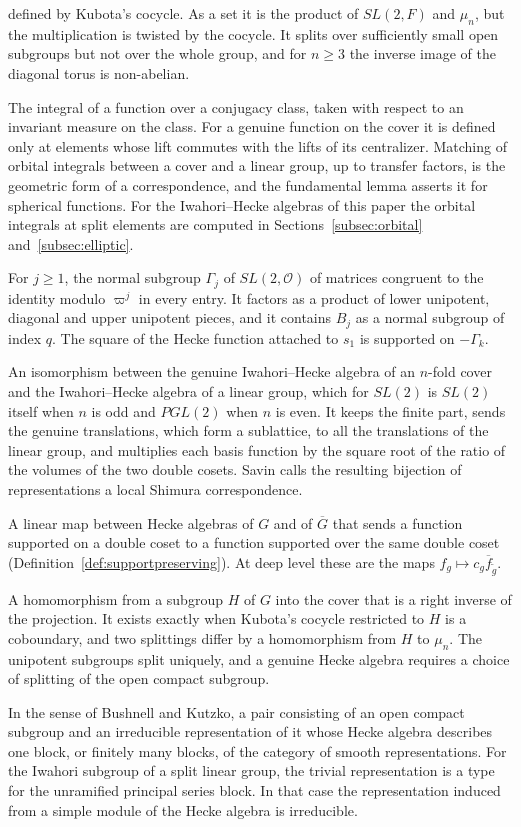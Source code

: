 \documentclass[12pt,letterpaper]{amsart}
\numberwithin{equation}{section}
\theoremstyle{definition}
\theoremstyle{remark}
\newcommand{\cO}{\mathcal{O}}
\newcommand{\Gbar}{\overline{G}}
\newcommand{\fbar}{\overline{f}}
\begin{document}
\begin{description}[leftmargin=1.5em,style=nextline]
defined by Kubota's cocycle. As a set it is the product of $SL(2,F)$ and
$\mu_n$, but the multiplication is twisted by the cocycle. It splits over
sufficiently small open subgroups but not over the whole group, and for
$n\geq 3$ the inverse image of the diagonal torus is non-abelian.
\item[Orbital integral] The integral of a function over a conjugacy
class, taken with respect to an invariant measure on the class. For a
genuine function on the cover it is defined only at elements whose
lift commutes with the lifts of its centralizer. Matching of orbital
integrals between a cover and a linear group, up to transfer factors,
is the geometric form of a correspondence, and the fundamental lemma
asserts it for spherical functions. For the Iwahori--Hecke algebras of
this paper the orbital integrals at split elements are computed in
Sections~\ref{subsec:orbital} and~\ref{subsec:elliptic}.
\item[Principal congruence subgroup] For $j\geq 1$, the normal subgroup
$\Gamma_j$ of $SL(2,\cO)$ of matrices congruent to the identity modulo
$\varpi^j$ in every entry. It factors as a product of lower unipotent,
diagonal and upper unipotent pieces, and it contains $B_j$ as a normal
subgroup of index $q$. The square of the Hecke function attached to
$s_1$ is supported on $-\Gamma_k$.
\item[Savin's isomorphism] An isomorphism between the genuine
Iwahori--Hecke algebra of an $n$-fold cover and the Iwahori--Hecke
algebra of a linear group, which for $SL(2)$ is $SL(2)$ itself when $n$
is odd and $PGL(2)$ when $n$ is even. It keeps the finite part, sends
the genuine translations, which form a sublattice, to all the
translations of the linear group, and multiplies each basis function by
the square root of the ratio of the volumes of the two double cosets.
Savin calls the resulting bijection of representations a local Shimura
correspondence.
\item[Support-preserving map] A linear map between Hecke algebras of
$G$ and of $\Gbar$ that sends a function supported on a double coset to
a function supported over the same double coset
(Definition~\ref{def:supportpreserving}). At deep level these are the
maps $f_g\mapsto c_g\fbar_{\tilde g}$.
\item[Splitting] A homomorphism from a subgroup $H$ of $G$ into the
cover that is a right inverse of the projection. It exists exactly when
Kubota's cocycle restricted to $H$ is a coboundary, and two splittings
differ by a homomorphism from $H$ to $\mu_n$. The unipotent subgroups
split uniquely, and a genuine Hecke algebra requires a choice of
splitting of the open compact subgroup.
\item[Type] In the sense of Bushnell and Kutzko, a pair consisting of an
open compact subgroup and an irreducible representation of it whose
Hecke algebra describes one block, or finitely many blocks, of the
category of smooth representations. For the Iwahori subgroup of a split
linear group, the trivial representation is a type for the unramified
principal series block. In that case the representation induced from a
simple module of the Hecke algebra is irreducible.
\end{description}
\end{document}
